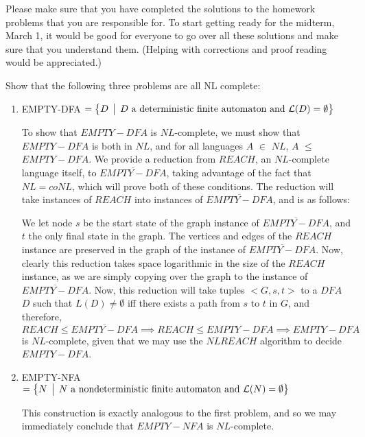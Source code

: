 \documentclass[12pt]{article}
\begin{document}
\thispagestyle{empty}
\noindent{}
\addtocounter{section}{7}

Please make sure that you have completed the solutions to the homework problems that you are
responsible for.   To start getting ready for the midterm, March 1, it would be good for everyone to
go over all these solutions and make sure that you understand them.  (Helping with corrections and
proof reading would be appreciated.)

Show that the following three problems are all NL complete:

\begin{enumerate}
\item  EMPTY-DFA $ = \bigl\{ D \,\bigm|\, D \mbox{ a deterministic finite automaton and } {\cal L}(D) =
  \emptyset \bigr\}$ 

To show that $EMPTY-DFA$ is $NL$-complete, we must show that $EMPTY-DFA$ is both in $NL$, and for all languages $A$ $\in$ $NL$, $A$ $\leq$ $EMPTY-DFA$. We provide a reduction from $REACH$, an $NL$-complete language itself, to $\overline{EMPTY-DFA}$, taking advantage of the fact that $NL = coNL$, which will prove both of these conditions. The reduction will take instances of $REACH$ into instances of $\overline{EMPTY-DFA}$, and is as follows: 

We let node $s$ be the start state of the graph instance of $\overline{EMPTY-DFA}$, and $t$ the only final state in the graph. The vertices and edges of the $REACH$ instance are preserved in the graph of the instance of $\overline{EMPTY-DFA}$. Now, clearly this reduction takes space logarithmic in the size of the $REACH$ instance, as we are simply copying over the graph to the instance of $\overline{EMPTY-DFA}$. Now, this reduction will take tuples $<G, s, t>$ to a $DFA$ $D$ such that $L(D) \neq \emptyset$ iff there exists a path from $s$ to $t$ in $G$, and therefore, $REACH \leq \overline{EMPTY-DFA} \implies REACH \leq EMPTY-DFA \implies EMPTY-DFA$ is $NL$-complete, given that we may use the $NL REACH$ algorithm to decide $EMPTY-DFA$.

\vspace*{.1in}

\item EMPTY-NFA $ = \bigl\{ N \,\bigm|\, N \mbox{ a nondeterministic finite automaton and } {\cal L}(N) =\emptyset \bigr\}$

This construction is exactly analogous to the first problem, and so we may immediately conclude that $EMPTY-NFA$ is $NL$-complete.


\end{enumerate}
\end{document}
